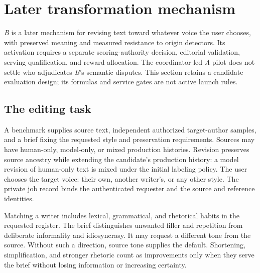 \section{Later transformation mechanism}\label{later-b}\label{reward-adjudication}

\textit{B} is a later mechanism for revising text toward whatever voice the
user chooses, with preserved meaning and measured resistance to origin
detectors. Its activation requires a separate scoring-authority decision,
editorial validation, serving qualification, and reward allocation. The
coordinator-led \textit{A} pilot does not settle who adjudicates \textit{B}'s
semantic disputes. This section retains a candidate evaluation design; its
formulas and service gates are not active launch rules.

\subsection{The editing task}\label{author-transformation-and-detector-evasion}

A benchmark supplies source text, independent authorized target-author samples,
and a brief fixing the requested style and preservation requirements. Sources
may have human-only, model-only, or mixed production histories. Revision
preserves source ancestry while extending the candidate's production history:
a model revision of human-only text is mixed under the initial labeling policy.
The user chooses the target voice: their own, another writer's, or any other
style. The private job record binds the authenticated requester and the source
and reference identities.

Matching a writer includes lexical, grammatical, and rhetorical habits in the
requested register. The brief distinguishes unwanted filler and repetition from
deliberate informality and idiosyncrasy. It may request a different tone from
the source. Without such a direction, source tone supplies the default.
Shortening, simplification, and stronger rhetoric count as improvements only
when they serve the brief without losing information or increasing certainty.

